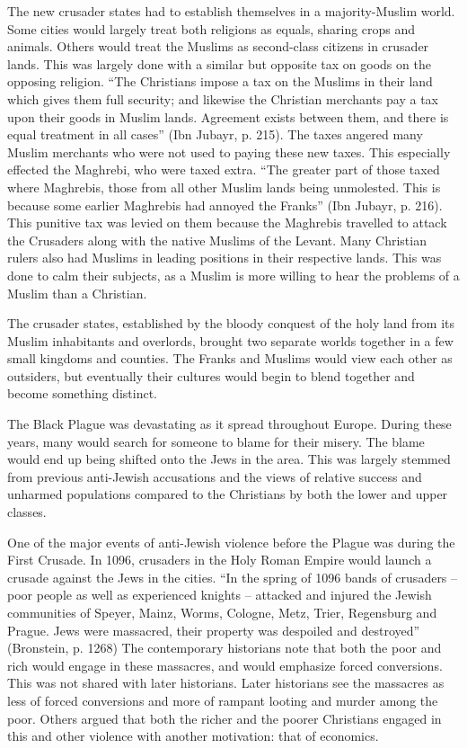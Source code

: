 \documentclass[12pt]{article}
\begin{document}
The new crusader states had to establish themselves in a majority-Muslim world.
Some cities would largely treat both religions as equals, sharing crops and animals.
Others would treat the Muslims as second-class citizens in crusader lands.
This was largely done with a similar but opposite tax on goods on the opposing religion.
``The Christians impose a tax on the Muslims in their land which gives them full security; and likewise the Christian merchants pay a tax upon their goods in Muslim lands. Agreement exists between them, and there is equal treatment in all cases'' (Ibn Jubayr, p. 215).
The taxes angered many Muslim merchants who were not used to paying these new taxes.
This especially effected the Maghrebi, who were taxed extra.
``The greater part of those taxed where Maghrebis, those from all other Muslim lands being unmolested. This is because some earlier Maghrebis had annoyed the Franks'' (Ibn Jubayr, p. 216).
This punitive tax was levied on them because the Maghrebis travelled to attack the Crusaders along with the native Muslims of the Levant.
Many Christian rulers also had Muslims in leading positions in their respective lands.
This was done to calm their subjects, as a Muslim is more willing to hear the problems of a Muslim than a Christian.

The crusader states, established by the bloody conquest of the holy land from its Muslim inhabitants and overlords, brought two separate worlds together in a few small kingdoms and counties.
The Franks and Muslims would view each other as outsiders, but eventually their cultures would begin to blend together and become something distinct.

\pagebreak

The Black Plague was devastating as it spread throughout Europe.
During these years, many would search for someone to blame for their misery.
The blame would end up being shifted onto the Jews in the area.
This was largely stemmed from previous anti-Jewish accusations and the views of relative success and unharmed populations compared to the Christians by both the lower and upper classes.

One of the major events of anti-Jewish violence before the Plague was during the First Crusade.
In 1096, crusaders in the Holy Roman Empire would launch a crusade against the Jews in the cities.
``In the spring of 1096 bands of crusaders – poor people as well as experienced knights – attacked and injured the Jewish communities of Speyer, Mainz, Worms, Cologne, Metz, Trier, Regensburg and Prague. Jews were massacred, their property was despoiled and destroyed'' (Bronstein, p. 1268)
The contemporary historians note that both the poor and rich would engage in these massacres, and would emphasize forced conversions.
This was not shared with later historians.
Later historians see the massacres as less of forced conversions and more of rampant looting and murder among the poor.
Others argued that both the richer and the poorer Christians engaged in this and other violence with another motivation: that of economics.
\end{document}
